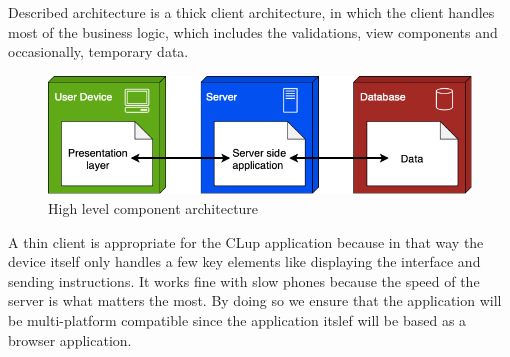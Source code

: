 Described architecture is a thick client architecture, in which the client handles most of the business logic, which includes the validations, view components and occasionally, temporary data.
\begin{figure}[H]
    \centering
    \includegraphics[height=0.2\textwidth]{Images/Overview.png}
    \caption{High level component architecture}
\end{figure}

A thin client is appropriate for the CLup application because in that way the device itself only handles a few key elements like displaying the interface and sending instructions.
It works fine with slow phones because the speed of the server is what matters the most.
By doing so we ensure that the application will be multi-platform compatible since the application itslef will be based as a browser application.


